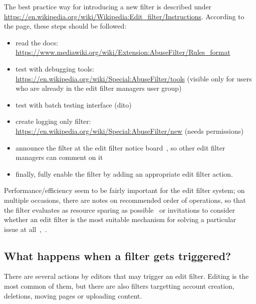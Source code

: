 \documentclass{sigchi}
\begin{document}
The best practice way for introducing a new filter is described under \url{https://en.wikipedia.org/wiki/Wikipedia:Edit_filter/Instructions}.
According to the page, these steps should be followed:
\begin{itemize}
    \item read the docs: \url{https://www.mediawiki.org/wiki/Extension:AbuseFilter/Rules_format}
    \item test with debugging tools: \url{https://en.wikipedia.org/wiki/Special:AbuseFilter/tools} (visible only for users who are already in the edit filter managers user group)
    \item test with batch testing interface (dito)
    \item create logging only filter: \url{https://en.wikipedia.org/wiki/Special:AbuseFilter/new} (needs permissions)
    \item announce the filter at the edit filter notice board~\cite{Wikipedia:EditFilterNoticeboard}, so other edit filter managers can comment on it
    \item finally, fully enable the filter by adding an appropriate edit filter action.
\end{itemize}

Performance/efficiency seem to be fairly important for the edit filter system;
on multiple occasions, there are notes on recommended order of operations, so that the filter evaluates as resource sparing as possible~\cite{Wikipedia:EditFilterInstructions} or invitations to consider whether an edit filter is the most suitable mechanism for solving a particular issue at all~\cite{Wikipedia:EditFilter},~\cite{Wikipedia:EditFilterRequested}.


\subsection{What happens when a filter gets triggered?}

There are several actions by editors that may trigger an edit filter.
Editing is the most common of them, but there are also filters targetting account creation, deletions, moving pages or uploading content. %
\end{document}
